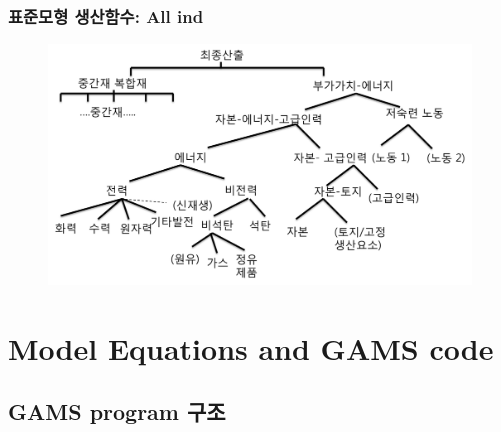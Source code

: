 \documentclass[10pt,compress,slidetop,%
			   hyperref={unicode},xcolor={svgnames},%
			   t]{beamer}
\begin{document}
\begin{frame}
	\frametitle{표준모형 생산함수: All ind}
		  	\begin{figure}
	\centering
	 \includegraphics[width=1.00\textwidth]{stpro.png}
	\end{figure}	
\end{frame}

\section{Model Equations and GAMS code}


\subsection{GAMS program 구조}
\end{document}
